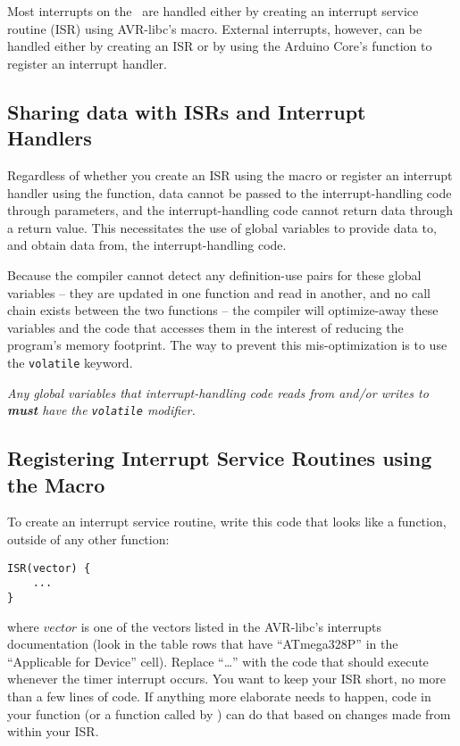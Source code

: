 Most interrupts on the \microcontroller\ are handled either by creating an interrupt service routine (ISR) using AVR-libc's  macro.
External interrupts, however, can be handled either by creating an ISR or by using the Arduino Core's  function to register an interrupt handler.


\subsection{Sharing data with ISRs and Interrupt Handlers} \label{subsec:isr}

Regardless of whether you create an ISR using the  macro or register an interrupt handler using the  function, data cannot be passed to the interrupt-handling code through parameters, and the interrupt-handling code cannot return data through a return value.
This necessitates the use of global variables to provide data to, and obtain data from, the interrupt-handling code.

Because the compiler cannot detect any definition-use pairs for these global variables --
they are updated in one function and read in another, and no call chain exists between the two functions --
the compiler will optimize-away these variables and the code that accesses them in the interest of reducing the program's memory footprint.
The way to prevent this mis-optimization is to use the \lstinline{volatile} keyword.

\textit{Any global variables that interrupt-handling code reads from and/or writes to \textbf{must} have the \lstinline{volatile} modifier.}


\subsection{Registering Interrupt Service Routines using the  Macro} \label{subsec:isrMacro}

To create an interrupt service routine, write this code that looks like a function, outside of any other function:

\begin{lstlisting}
ISR(vector) {
    ...
}
\end{lstlisting}

where $vector$ is one of the vectors listed in the AVR-libc's interrupts documentation\cite{avrInterrupt}
(look in the table rows that have ``ATmega328P'' in the ``Applicable for Device'' cell).
Replace ``\dots'' with the code that should execute whenever the timer interrupt occurs.
You want to keep your ISR short, no more than a few lines of code.
If anything more elaborate needs to happen, code in your  function (or a function called by ) can do that based on changes made from within your ISR.

